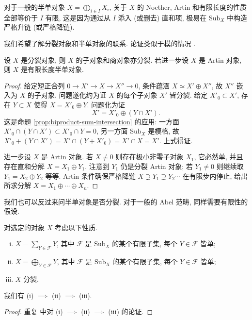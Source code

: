 \begin{remark}
	对于一般的半单对象 $X = \bigoplus_{i \in I} X_i$, 关于 $X$ 的 Noether, Artin 和有限长度的性质全部等价于 $I$ 有限, 这是因为通过从 $I$ 添入 (或删去) 直和项, 极易在 $\mathrm{Sub}_X$ 中构造严格升链 (或严格降链).
\end{remark}

我们希望了解分裂对象和半单对象的联系. 论证类似于模的情况 \cite[命题 6.11.4]{Li1}.

\begin{proposition}
	设 $X$ 是分裂对象, 则 $X$ 的子对象和商对象亦分裂. 若进一步设 $X$ 是 Artin 对象, 则 $X$ 是有限长度半单对象.
\end{proposition}
\begin{proof}
	给定短正合列 $0 \to X' \to X \to X'' \to 0$, 条件蕴涵 $X \simeq X' \oplus X''$, 故 $X''$ 嵌入为 $X$ 的子对象. 问题遂化约为证 $X$ 的每个子对象 $X'$ 皆分裂. 给定 $X'_0 \subset X'$, 存在 $Y \subset X$ 使得 $X = X'_0 \oplus Y$. 问题化为证
	\[ X' = X'_0 \oplus (Y \cap X'). \]
	这是命题 \ref{prop:biproduct-sum-intersection} 的应用: 一方面 $X'_0 \cap (Y \cap X') \subset X'_0 \cap Y = 0$, 另一方面 $\mathrm{Sub}_X$ 是模格, 故 $X'_0 + (Y \cap X') = X' \cap (Y + X'_0) = X' \cap X = X'$. 上式得证.
	
	进一步设 $X$ 是 Artin 对象. 若 $X \neq 0$ 则存在极小非零子对象 $X_1$, 它必然单, 并且存在直和分解 $X = X_1 \oplus Y_1$. 注意到 $Y_1$ 仍是分裂 Artin 对象; 若 $Y_1 \neq 0$ 则继续取 $Y_1 = X_2 \oplus Y_2$ 等等. Artin 条件确保严格降链 $X \supsetneq Y_1 \supsetneq Y_2 \cdots$ 在有限步内停止, 给出所求分解 $X = X_1 \oplus \cdots \oplus X_n$.
\end{proof}

我们也可以反过来问半单对象是否分裂. 对于一般的 Abel 范畴, 同样需要有限性的假设.

\begin{proposition}\label{prop:ss-decomp}
	对选定的对象 $X$ 考虑以下性质.
	\begin{enumerate}[(i)]
		\item $X = \sum_{Y \in \mathcal{F}} Y$, 其中 $\mathcal{F}$ 是 $\mathrm{Sub}_X$ 的某个有限子集, 每个 $Y \in \mathcal{F}$ 皆单;
		\item $X = \bigoplus_{Y \in \mathcal{F}} Y$, 其中 $\mathcal{F}$ 是 $\mathrm{Sub}_X$ 的某个有限子集, 每个 $Y \in \mathcal{F}$ 皆单;
		\item $X$ 分裂.
	\end{enumerate}
	我们有 (i) $\implies$ (ii) $\implies$ (iii).
\end{proposition}
\begin{proof}
	重复 \cite[命题 6.11.4]{Li1} 中对 (i) $\implies$ (ii) $\implies$ (iii) 的论证.
\end{proof}

